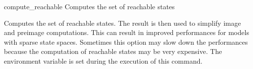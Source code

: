 \begin{nusmvCommand}{compute\_reachable} {Computes the set of reachable states}


Computes the set of reachable states. The result is then used to
simplify image and preimage computations. This can result in improved
performances for models with sparse state spaces. Sometimes this
option may slow down the performances because the computation of
reachable states may be very expensive. The environment variable
 is set during the execution of this
command.

\end{nusmvCommand}
